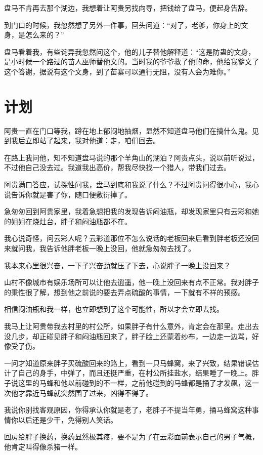 盘马不肯再去那个湖边，我想着让阿贵另找向导，把钱给了盘马，便起身告辞。

到门口的时候，我忽然想了另外一件事，回头问道：“对了，老爹，你身上的文身，是怎么来的？”

盘马看着我，有些诧异我忽然问这个，他的儿子替他解释道：“这是防蛊的文身，是小时候一个路过的苗人巫师替他文的。当时我的爷爷救了他的命，他给我爹文了这个答谢，据说有这个文身，到了苗寨可以通行无阻，没有人会为难你。”

\chapter{计划}

阿贵一直在门口等我，蹲在地上郁闷地抽烟，显然不知道盘马他们在搞什么鬼。见到我后立即站了起来，我对他道：走，咱们回去。

在路上我问他，知不知道盘马说的那个羊角山的湖泊？阿贵点头，说以前听说过，不过他自己没去过。我道我出高价，帮我尽快找一个猎人，带我们过去。

阿贵满口答应，试探性问我，盘马到底和我说了什么？不过阿贵问得很小心，我心说告诉你就是害了你，随口便敷衍掉了。

急匆匆回到阿贵家里，我着急想把我的发现告诉闷油瓶，却发现家里只有云彩和她的姐姐在烧灶台，胖子和闷油瓶都不在。

我心说奇怪，问云彩人呢？云彩道那位不怎么说话的老板回来后看到胖老板还没回来就问我，我告诉他胖老板一晚上没回，他就急匆匆去找了。

我本来心里很兴奋，一下子兴奋劲就压了下去，心说胖子一晚上没回来？

山村不像城市有娱乐场所可以让他去逍遥，他一晚上没回来有点不正常。我对胖子的秉性很了解，想到他之前说的要去弄点硫酸的事情，一下就有不祥的预感。

相信闷油瓶和我一样，也立即想到了这个可能性，所以才会立即去找。

我马上让阿贵带我去村里的村公所，如果胖子有什么意外，肯定会在那里。走出去没几步，却正碰见胖子和闷油瓶回来了，胖子脸上还蒙着纱布，一边走一边骂，好像受了伤。

一问才知道原来胖子买硫酸回来的路上，看到一只马蜂窝，来了兴致，结果错误估计了自己的身手，中弹了，而且还挺严重，在村公所挂盐水，结果睡了一晚上。胖子说这里的马蜂和他以前碰到的不一样，之前他碰到的马蜂都是捅了才发飙，这一次他才靠近马蜂就突然围了过来，凶得不得了。

我说你别找客观原因，你得承认你就是老了，老胖子不提当年勇，捅马蜂窝这种事情你以后还是少干，免得别人笑话。

回房给胖子换药，换药显然极其疼，要不是为了在云彩面前表示自己的男子气概，他肯定叫得像杀猪一样。

